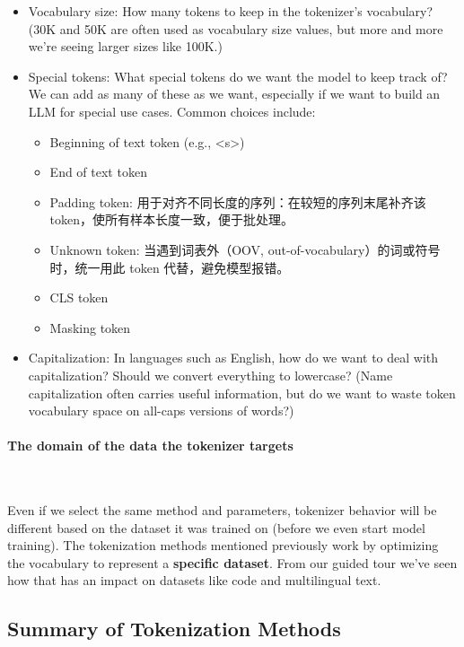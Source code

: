 \begin{itemize}
    \item Vocabulary size: How many tokens to keep in the tokenizer's vocabulary? (30K and 50K are often used as vocabulary size values, but more and more we're seeing larger sizes like 100K.)
    \item Special tokens: What special tokens do we want the model to keep track of? We can add as many of these as we want, especially if we want to build an LLM for special use cases. Common choices include:
    \begin{itemize}
        \item Beginning of text token (e.g., <s>)
        \item End of text token
        \item Padding token: 用于对齐不同长度的序列：在较短的序列末尾补齐该 token，使所有样本长度一致，便于批处理。
        \item Unknown token: 当遇到词表外（OOV, out-of-vocabulary）的词或符号时，统一用此 token 代替，避免模型报错。
        \item CLS token
        \item Masking token  
    \end{itemize}
    
    \item Capitalization: In languages such as English, how do we want to deal with capitalization? Should we convert everything to lowercase? (Name capitalization often carries useful information, but do we want to waste token vocabulary space on all-caps versions of words?)
\end{itemize}



\paragraph{The domain of the data the tokenizer targets}~{}

Even if we select the same method and parameters, tokenizer behavior will be different based on the dataset it was trained on (before we even start model training). The tokenization methods mentioned previously work by optimizing the vocabulary to represent a \textbf{specific dataset}. From our guided tour we've seen how that has an impact on datasets like code and multilingual text.




\subsection{Summary of Tokenization Methods}

